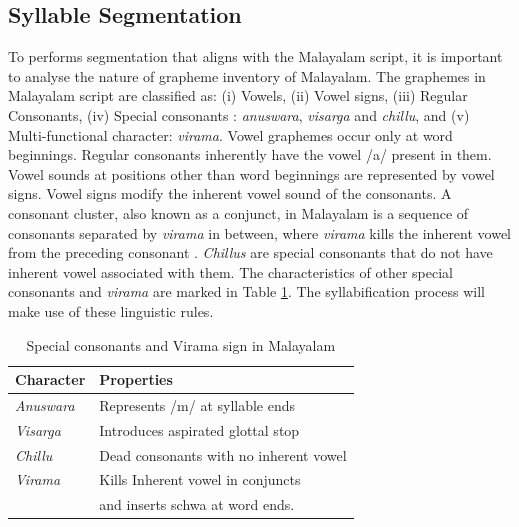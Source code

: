 \subsection{Syllable Segmentation}
\label{sec:ch-openvocab-syllabification}

To performs segmentation that aligns with the Malayalam script, it is important
to analyse the nature of grapheme inventory of Malayalam. The graphemes in
Malayalam script are classified as:
(i) Vowels, (ii) Vowel signs, (iii) Regular Consonants, (iv) Special consonants : \textit{anuswara}, \textit{visarga} and \textit{chillu}, and (v) Multi-functional character: \textit{virama}. Vowel graphemes occur only at word beginnings. Regular consonants inherently have the vowel /{\ipa a}/ present in them. Vowel sounds at positions other than word beginnings are represented by vowel signs. Vowel signs modify the inherent vowel sound of the consonants. A consonant cluster, also known as a conjunct, in Malayalam is a sequence of consonants separated by \textit{virama} in between, where \textit{virama} kills the inherent vowel from the preceding consonant \cite{asher1997}. \textit{Chillus} are special consonants that do not have inherent vowel associated with them. The characteristics of other special consonants and \textit{virama} are marked in Table \ref{tab:specialsigns}. The syllabification process will make use of these linguistic rules.

\begin{table}[htpb]
    \caption{Special consonants and Virama sign in Malayalam}
    \label{tab:specialsigns}
    \centering
    \begin{tabular}{ll}
        \hline \hline
        \textbf{Character} & \textbf{Properties}                    \\ \hline
        \textit{Anuswara}  & Represents /m/ at syllable ends        \\
        \textit{Visarga}   & Introduces aspirated glottal stop      \\
        \textit{Chillu }   & Dead consonants with no inherent vowel \\
        \textit{Virama}    & Kills Inherent vowel in conjuncts      \\
                           &  and inserts schwa at  word ends.           \\

        \hline \hline
    \end{tabular}
\end{table}

